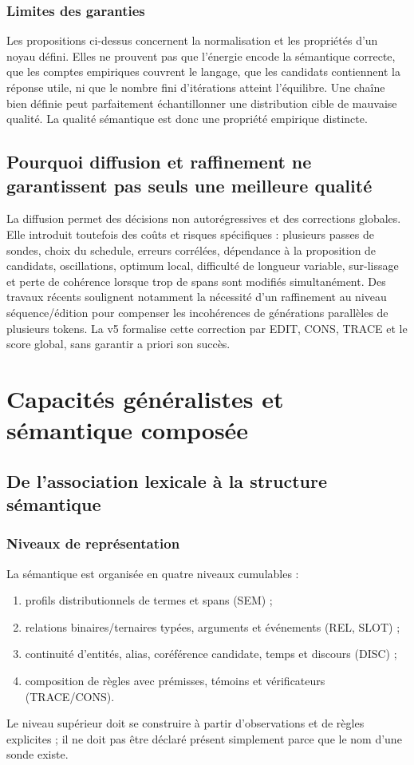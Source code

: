 \documentclass[11pt,a4paper,oneside]{report}
\begin{document}
\section{Limites des garanties}
Les propositions ci-dessus concernent la normalisation et les propriétés d'un noyau défini. Elles ne prouvent pas que l'énergie encode la sémantique correcte, que les comptes empiriques couvrent le langage, que les candidats contiennent la réponse utile, ni que le nombre fini d'itérations atteint l'équilibre. Une chaîne bien définie peut parfaitement échantillonner une distribution cible de mauvaise qualité. La qualité sémantique est donc une propriété empirique distincte.

\chapter{Pourquoi diffusion et raffinement ne garantissent pas seuls une meilleure qualité}
La diffusion permet des décisions non autorégressives et des corrections globales. Elle introduit toutefois des coûts et risques spécifiques : plusieurs passes de sondes, choix du schedule, erreurs corrélées, dépendance à la proposition de candidats, oscillations, optimum local, difficulté de longueur variable, sur-lissage et perte de cohérence lorsque trop de spans sont modifiés simultanément. Des travaux récents soulignent notamment la nécessité d'un raffinement au niveau séquence/édition pour compenser les incohérences de générations parallèles de plusieurs tokens. La v5 formalise cette correction par EDIT, CONS, TRACE et le score global, sans garantir a priori son succès.

\part{Capacités généralistes et sémantique composée}
\chapter{De l'association lexicale à la structure sémantique}
\section{Niveaux de représentation}
La sémantique est organisée en quatre niveaux cumulables :
\begin{enumerate}
\item profils distributionnels de termes et spans (SEM) ;
\item relations binaires/ternaires typées, arguments et événements (REL, SLOT) ;
\item continuité d'entités, alias, coréférence candidate, temps et discours (DISC) ;
\item composition de règles avec prémisses, témoins et vérificateurs (TRACE/CONS).
\end{enumerate}
Le niveau supérieur doit se construire à partir d'observations et de règles explicites ; il ne doit pas être déclaré présent simplement parce que le nom d'une sonde existe.
\end{document}

